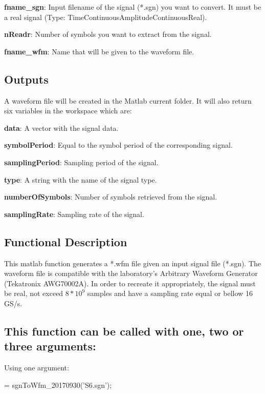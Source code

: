 \indent

\textbf{fname\_sgn}: Input filename of the signal (*.sgn) you want to convert. It must be a real signal (Type: TimeContinuousAmplitudeContinuousReal).
\bigskip

\textbf{nReadr}: Number of symbols you want to extract from the signal.
\bigskip

\textbf{fname\_wfm}: Name that will be given to the waveform file.


\subsection*{Outputs}
A waveform file will be created in the Matlab current folder. It will also return six variables in the workspace which are:
\bigskip

\textbf{data}: A vector with the signal data.
\bigskip

\textbf{symbolPeriod}: Equal to the symbol period of the corresponding signal.
\bigskip

\textbf{samplingPeriod}: Sampling period of the signal.
\bigskip

\textbf{type}: A string with the name of the signal type.
\bigskip

\textbf{numberOfSymbols}: Number of symbols retrieved from the signal.
\bigskip

\textbf{samplingRate}: Sampling rate of the signal.



\subsection*{Functional Description}

This matlab function generates a *.wfm file given an input signal file (*.sgn). The waveform file is compatible with the laboratory's Arbitrary Waveform Generator (Tekatronix AWG70002A). In order to recreate it appropriately, the signal must be real, not exceed $8*10^9$ samples and have a sampling rate equal or bellow 16 GS/s.


\subsection*{This function can be called with one, two or three arguments:}
Using one argument:

\bigskip

 = sgnToWfm\_20170930('S6.sgn');
\bigskip

